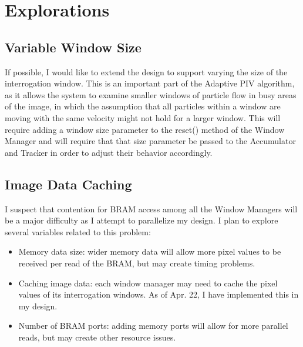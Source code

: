 \documentclass{article}
\begin{document}
\section{Explorations}
\subsection{Variable Window Size}
If possible, I would like to extend the design to support varying the size of the interrogation window. This is an important part of the Adaptive PIV algorithm, as it allows the system to examine smaller windows of particle flow in busy areas of the image, in which the assumption that all particles within a window are moving with the same velocity might not hold for a larger window. This will require adding a window size parameter to the reset() method of the Window Manager and will require that that size parameter be passed to the Accumulator and Tracker in order to adjust their behavior accordingly. 

\subsection{Image Data Caching}
I suspect that contention for BRAM access among all the Window Managers will be a major difficulty as I attempt to parallelize my design. I plan to explore several variables related to this problem: 
\begin{itemize}
	\item Memory data size: wider memory data will allow more pixel values to be received per read of the BRAM, but may create timing problems.
	\item Caching image data: each window manager may need to cache the pixel values of its interrogation windows. As of Apr. 22, I have implemented this in my design.
	\item Number of BRAM ports: adding memory ports will allow for more parallel reads, but may create other resource issues.
\end{itemize}

	
	
\end{document}
